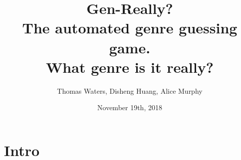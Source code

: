 \documentclass{article}
\title{%
  Gen-Really? \\
  \large The automated genre guessing game. \\
  What genre is it really?
}
\author{Thomas Waters, Disheng Huang, Alice Murphy}
\date{November 19th, 2018}
\begin{document}
\maketitle

\break

\section{Intro}

\end{document}

